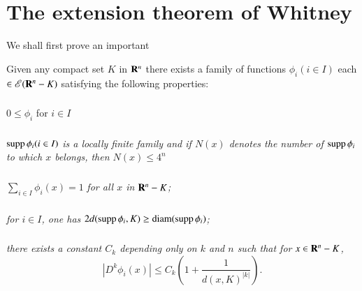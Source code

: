 \section{The extension theorem of Whitney}\label{chap1-sec3}

We shall first prove an important

\begin{lemma}\label{chap1-lem3.1}
Given any compact set $K$ in $\mathbf{R}^{n}$ there exists a family of functions $\phi_{i}(i\in I)$ each $\in \mathscr{E}(\mathbf{R}^{n}-K)$ satisfying the following properties:
\end{lemma}

\setcounter{subsection}{1}
\subsubsection{}\label{chap1-sec3.1.1}
$0\leq \phi_{i}$ for $i\in I$

\subsubsection{}\label{chap1-sec3.1.2}
$\operatorname{supp} \phi_{i}(i\in I)$ {\em is a locally finite family and if $N(x)$ denotes the number of $\operatorname{supp} \phi_{i}$ to which $x$ belongs, then $N(x)\leq 4^{n}$}

\subsubsection{}\label{chap1-sec3.1.3}
$\sum\limits_{i\in I}\phi_{i}(x)=1$ {\em for all $x$ in $\mathbf{R}^{n}-K$;}

\subsubsection{}\label{chap1-sec3.1.4}
{\em for $i\in I$, one has $2d(\operatorname{supp} \phi_{i},K)\geq \operatorname{diam} (\operatorname{supp} \phi_{i})$;}

\subsubsection{}\label{chap1-sec3.1.5}
{\em there exists a constant $C_{k}$ depending only on $k$ and $n$ such that for $x\in \mathbf{R}^{n}-K$,}
$$
|D^{k}\phi_{i}(x)|\leq C_{k}\left(1+\dfrac{1}{d(x,K)^{|k|}}\right).
$$


